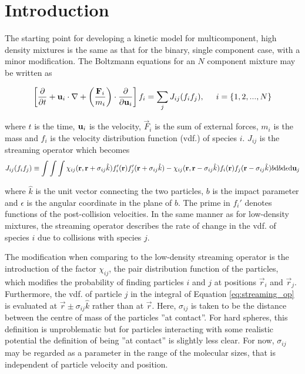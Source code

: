 \section{Introduction}

The starting point for developing a kinetic model for multicomponent, high density mixtures is the same as that for the binary, single component case, with a minor modification. The Boltzmann equations for an $N$ component mixture may be written as

\begin{equation}
    \left[ \frac{\partial }{\partial t} + \boldsymbol{\mathrm{u}}_i \cdot \nabla + \left(\frac{\boldsymbol{\mathrm{F}}_i}{m_i}\right) \cdot \frac{\partial }{\partial \boldsymbol{\mathrm{u}}_i} \right] f_i = \sum_j J_{ij}(f_i f_j), \hspace{.5cm} i = \{1, 2, ..., N\}
    \label{eq:boltzmann_multi}
\end{equation}

where $t$ is the time, $\boldsymbol{\mathrm{u}}_i$ is the velocity, $\Vec{F}_i$ is the sum of external forces, $m_i$ is the mass and $f_i$ is the velocity distribution function (vdf.) of species $i$. $J_{ij}$ is the streaming operator which becomes
\begin{equation}
    J_{ij}(f_i f_j) \equiv \int \int \int \chi_{ij}(\boldsymbol{\mathrm{r}}, \boldsymbol{\mathrm{r}} + \sigma_{ij}\hat{k}) f_i'(\boldsymbol{\mathrm{r}})f_j'(\boldsymbol{\mathrm{r}} + \sigma_{ij}\hat{k}) - \chi_{ij}(\boldsymbol{\mathrm{r}}, \boldsymbol{\mathrm{r}} - \sigma_{ij} \hat{k})f_i(\boldsymbol{\mathrm{r}})f_j(\boldsymbol{\mathrm{r}} - \sigma_{ij}\hat{k}) b\mathrm{d} b \mathrm{d} \epsilon \mathrm{d} \boldsymbol{\mathrm{u}}_j
    \label{eq:streaming_op}
\end{equation}

where $\hat{k}$ is the unit vector connecting the two particles, $b$ is the impact parameter and $\epsilon$ is the angular coordinate in the plane of $b$. The prime in $f_i'$ denotes functions of the post-collision velocities. In the same manner as for low-density mixtures, the streaming operator describes the rate of change in the vdf. of species $i$ due to collisions with species $j$. 

The modification when comparing to the low-density streaming operator is the introduction of the factor $\chi_{ij}$, the pair distribution function of the particles, which modifies the probability of finding particles $i$ and $j$ at positions $\Vec{r}_i$ and $\Vec{r}_j$. Furthermore, the vdf. of particle $j$ in the integral of Equation \eqref{eq:streaming_op} is evaluated at $\Vec{r} \pm \sigma_{ij} \hat{k}$ rather than at $\Vec{r}$. Here, $\sigma_{ij}$ is taken to be the distance between the centre of mass of the particles ''at contact''. For hard spheres, this definition is unproblematic but for particles interacting with some realistic potential the definition of being ''at contact'' is slightly less clear. For now, $\sigma_{ij}$ may be regarded as a parameter in the range of the molecular sizes, that is independent of particle velocity and position.

